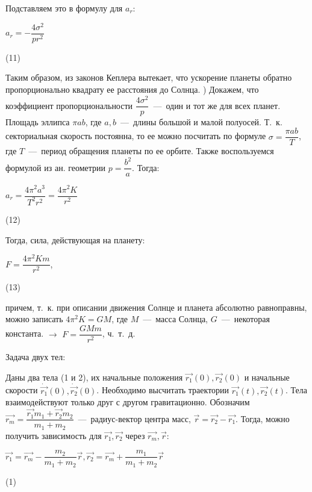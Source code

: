 \documentclass[12pt,a4paper,fleqn]{article}
\begin{document}
Подставляем это в формулу для $a_r$:
\begin{center}
$a_r = -\dfrac{4 \sigma^2}{pr^2}$
\begin{flushright}
(11)
\end{flushright}
\end{center}
Таким образом, из законов Кеплера вытекает, что ускорение планеты обратно пропорционально квадрату ее расстояния до Солнца. ) Докажем, что коэффициент пропорциональности $\dfrac{4 \sigma^2}{p}$~---~один и тот же для всех планет. \newline
Площадь эллипса $\pi ab$, где $a, b$~---~длины большой и малой полуосей. Т.~к. секториальная скорость постоянна, то ее можно посчитать по формуле $\sigma = \dfrac{\pi ab}{T}$, где  $T$~---~период обращения планеты по ее орбите. Также воспользуемся формулой из ан. геометрии $p = \dfrac{b^2}{a}$. Тогда:
\begin{center}
$a_r = \dfrac{4 \pi^2 a^3}{T^2 r^2} = \dfrac{4 \pi^2 \mathit{K}}{r^2}$
\begin{flushright}
(12)
\end{flushright}
\end{center}
Тогда, сила, действующая на планету: 
\begin{center}
$F = \dfrac{4 \pi^2 \mathit{K} m}{r^2}$,
\begin{flushright}
(13)
\end{flushright}
\end{center} 
причем, т.~к. при описании движения Солнце и планета абсолютно равноправны, можно записать $4 \pi^2 \mathit{K} = GM$, где $M$~---~масса Солнца, $G$~---~некоторая константа. $\rightarrow$ $F = \dfrac{GMm}{r^2}$, ч.~т.~д.
\begin{center}
Задача двух тел:
\end{center}
Даны два тела (1 и 2), их начальные положения $\vec{r_1}(0), \vec{r_2}(0)$ и начальные скорости $\dot{\vec{r_1}}(0), \dot{\vec{r_2}}(0)$. Необходимо высчитать траектории $\vec{r_1}(t), \vec{r_2}(t)$. Тела взаимодействуют только друг с другом гравитационно. \newline
Обозначим $\vec{r_m} = \dfrac{\vec{r_1}m_1 + \vec{r_2}m_2}{m_1 + m_2}$~---~радиус-вектор центра масс, $\vec{r} = \vec{r_2} - \vec{r_1}$. Тогда, можно получить зависимость для $\vec{r_1}, \vec{r_2}$ через $\vec{r_m}, \vec{r}$: 
\begin{center}
$\vec{r_1} = \vec{r_m} - \dfrac{m_2}{m_1 + m_2} \vec{r}, \vec{r_2} = \vec{r_m} + \dfrac{m_1}{m_1 + m_2} \vec{r}$
\begin{flushright}
(1)
\end{flushright}
\end{center}
\end{document}
